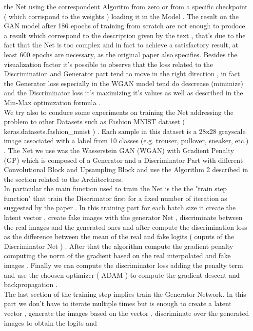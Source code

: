 the Net using the correspondent Algoritm from zero or from a specific checkpoint ( which corrispond
to the weights ) loading it in the Model . 
The result on the GAN model after 186 epochs of training from scratch are not enough to prodoce a result 
which correspond to the description given by the text , that's due to the fact that the Net is too complex 
and in fact to achieve a satisfactory result, at least 600 epochs are necessary, 
as the original paper also specifies.
Besides the visualization factor it's possible to observe that the loss related to the Discrimination and 
Generator part tend to move in the right direction , in fact the Generator loss especially in the WGAN model
tend do descrease (minimize) and the Discriminator loss it's maximizing it's values as well as described 
in the Min-Max optimization formula .
\\
We try also to conduce some experiments on training the Net addressing the problem to other Datasets 
such as Fashion MNIST dataset ( keras.datasets.fashion\_mnist ) .
Each sample in this dataset is a 28x28 grayscale image associated with a 
label from 10 classes (e.g. trouser, pullover, sneaker, etc.) .
The Net we use was the Wasserstein GAN (WGAN) with Gradient Penalty (GP) which is composed of a Generator 
and a Discriminator Part with different Convolutional Block and Upsampling Block and use the 
Algorithm 2 described in the section related to the Architectures.
\\
In particular the main function used to train the Net is the 
the "train step function" that train the Discrimator first for a fixed 
number of iteration as suggested by the paper .
In this training part for each batch size it create the latent vector , 
create fake images with the generator Net , discriminate between the 
real images and the generated ones and after compute the discrimination 
loss as the difference between the mean of the real and fake logits 
( ouputs of the Discriminator Net ) .
After that the algorithm compute the gradient penalty computing the norm 
of the gradient based on the real interpolated and fake images .
Finally we can compute the discriminator loss adding the penalty term 
and use the choosen optimizer ( ADAM ) to compute the gradient 
descent and backpropagation . 
\\
The last section of the training step implies train the Generator Network.
In this part we don't have to iterate multiple times but is enough to 
create a latent vector , generate the images based on the vector , 
discriminate over the generated images to obtain the logits and 
